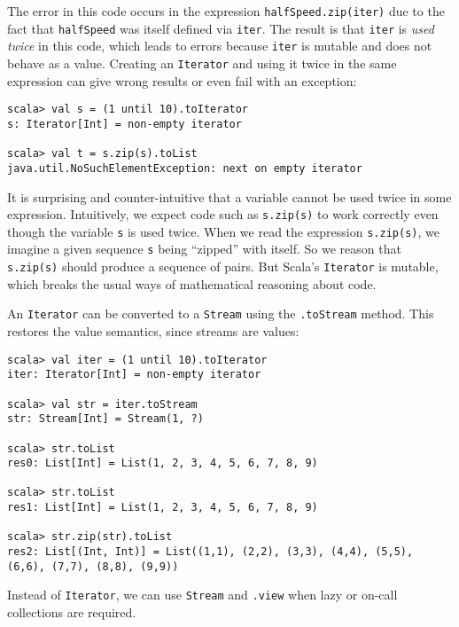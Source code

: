 The error in this code occurs in the expression \lstinline!halfSpeed.zip(iter)!
due to the fact that \lstinline!halfSpeed! was itself defined via
\lstinline!iter!. The result is that \lstinline!iter! is \emph{used
twice} in this code, which leads to errors because \lstinline!iter!
is mutable and does not behave as a value. Creating an \lstinline!Iterator!
and using it twice in the same expression can give wrong results or
even fail with an exception:
\begin{lstlisting}
scala> val s = (1 until 10).toIterator
s: Iterator[Int] = non-empty iterator

scala> val t = s.zip(s).toList
java.util.NoSuchElementException: next on empty iterator
\end{lstlisting}
It is surprising and counter-intuitive that a variable cannot be used
twice in some expression. Intuitively, we expect code such as \lstinline!s.zip(s)!
to work correctly even though the variable \lstinline!s! is used
twice. When we read the expression \lstinline!s.zip(s)!, we imagine
a given sequence \lstinline!s! being ``zipped'' with itself. So
we reason that \lstinline!s.zip(s)! should produce a sequence of
pairs. But Scala's \lstinline!Iterator! is mutable, which breaks
the usual ways of mathematical reasoning about code.

An \lstinline!Iterator! can be converted to a \lstinline!Stream!
using the \lstinline!.toStream! method. This restores the value semantics,
since streams are values:
\begin{lstlisting}
scala> val iter = (1 until 10).toIterator
iter: Iterator[Int] = non-empty iterator

scala> val str = iter.toStream
str: Stream[Int] = Stream(1, ?)

scala> str.toList
res0: List[Int] = List(1, 2, 3, 4, 5, 6, 7, 8, 9)

scala> str.toList
res1: List[Int] = List(1, 2, 3, 4, 5, 6, 7, 8, 9)

scala> str.zip(str).toList
res2: List[(Int, Int)] = List((1,1), (2,2), (3,3), (4,4), (5,5), (6,6), (7,7), (8,8), (9,9)) 
\end{lstlisting}
Instead of \lstinline!Iterator!, we can use \lstinline!Stream! and
\lstinline!.view! when lazy or on-call collections are required. 
